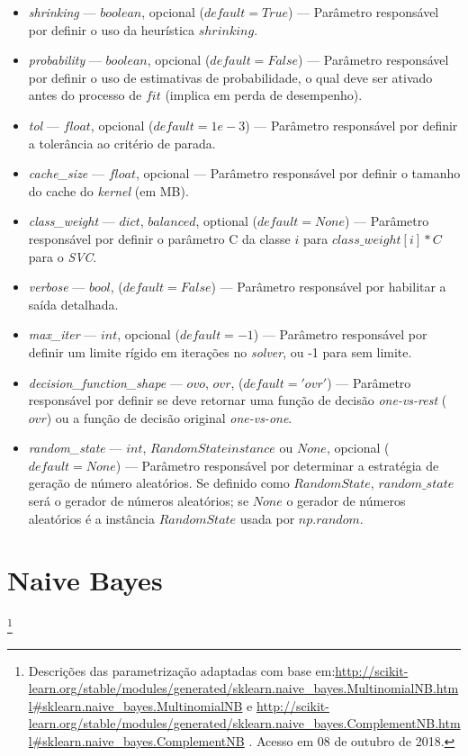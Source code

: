 \documentclass[
	12pt,				%
	oneside,			%
	a4paper,			%
	english,			%
	brazil				%
	]{abntex2ppgsi}
\begin{document}
{{{\begin{apendicesenv}
\begin{itemize}
\item \textit{shrinking} --- $boolean$, opcional ($default=True$) --- Parâmetro responsável por definir o uso da heurística $shrinking$.

\item \textit{probability} --- $boolean$, opcional ($default=False$) --- Parâmetro responsável por definir o uso de estimativas de probabilidade, o qual deve ser ativado antes do processo de $fit$ (implica em perda de desempenho).

\item \textit{tol} --- $float$, opcional ($default=1e-3$) --- Parâmetro responsável por definir a tolerância ao critério de parada.

\item \textit{cache\_size} --- $float$, opcional --- Parâmetro responsável por definir o tamanho do cache do \textit{kernel} (em MB).

\item \textit{class\_weight} --- $dict$, $balanced$, optional ($default = None$) --- Parâmetro responsável  por definir o parâmetro C da classe $i$ para $class\_weight[i]*C$ para o \textit{SVC}.

\item \textit{verbose} --- $bool$, ($default = False$) --- Parâmetro responsável por habilitar a saída detalhada.

\item \textit{max\_iter} --- $int$, opcional ($default=-1$) --- Parâmetro responsável por definir um limite rígido em iterações no \textit{solver}, ou -1 para sem limite.

\item \textit{decision\_function\_shape} --- $ovo$, $ovr$, ($default='ovr'$) --- Parâmetro responsável por definir se deve retornar uma função de decisão \textit{one-vs-rest} ($ovr$) ou a função de decisão original \textit{one-vs-one}.

\item \textit{random\_state} --- $int$, $RandomState instance$ ou $None$, opcional ($default=None$) --- Parâmetro responsável por determinar a estratégia de geração de número aleatórios. Se definido como $RandomState$, $random\_state$ será o gerador de números aleatórios; se $None$ o gerador de números aleatórios é a instância $RandomState$ usada por $np.random$.

\end{itemize}

\section{Naive Bayes}\footnote{Descrições das parametrização adaptadas com base em:\url{http://scikit-learn.org/stable/modules/generated/sklearn.naive_bayes.MultinomialNB.html\#sklearn.naive_bayes.MultinomialNB} e \url{http://scikit-learn.org/stable/modules/generated/sklearn.naive_bayes.ComplementNB.html\#sklearn.naive_bayes.ComplementNB} . Acesso em 08 de outubro de 2018.}


\end{apendicesenv}}}}
\end{document}
